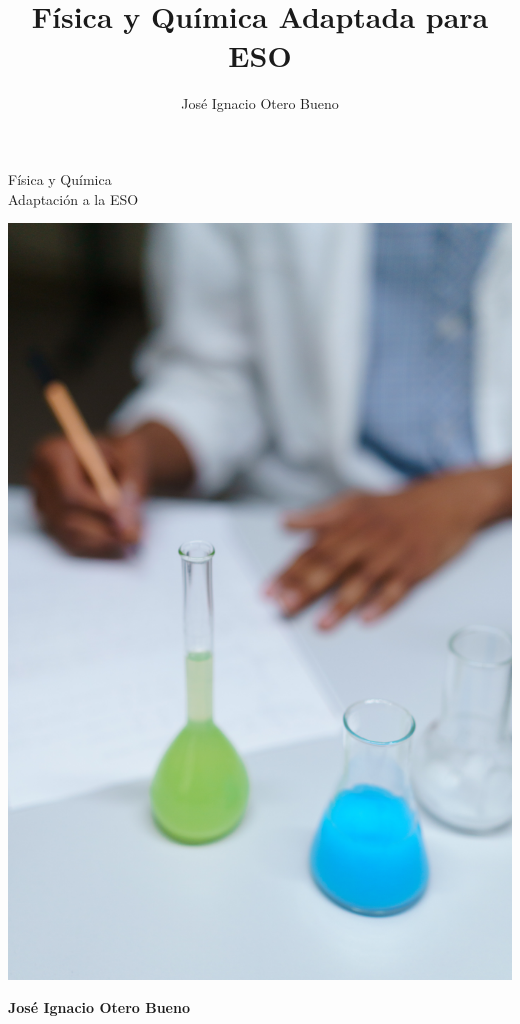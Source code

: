 \documentclass[12pt]{book}
\title{Física y Química Adaptada para ESO}
\author{José Ignacio Otero Bueno}
\begin{document}
	\begin{titlepage}
	\centering
	\Huge{Física y Química}
	\\
	\large{Adaptación a la ESO}
	\begin{center}
\includegraphics[scale=0.09]{imagenes/portada}
\end{center}
		\normalsize
		\begin{flushright}
		\textbf{José Ignacio Otero Bueno}
		\end{flushright}
	\end{titlepage}	
	
	
	
	
	
	


\tableofcontents



%
%

%


%

\nocite{*}


\end{document}

